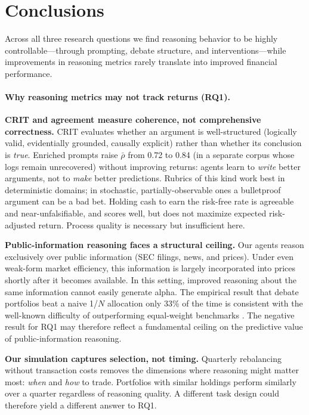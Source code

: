 \documentclass{article}
\begin{document}
\section{Conclusions}
\label{sec:conclusions}
\vspace{-0.3cm}

Across all three research questions we find reasoning behavior to be highly controllable---through prompting, debate structure, and interventions---while improvements in reasoning metrics rarely translate into improved financial performance. 

\vspace{-6pt}
\paragraph{Why reasoning metrics may not track returns (RQ1).}
\vspace{-4pt}


\textbf{CRIT and agreement measure coherence, not comprehensive correctness.}
CRIT evaluates whether an argument is well-structured (logically valid, evidentially grounded, causally explicit) rather than whether its conclusion is \emph{true}. Enriched prompts raise $\bar{\rho}$ from 0.72 to 0.84 (in a separate corpus whose logs remain unrecovered) without improving returns: agents learn to \emph{write} better arguments, not to \emph{make} better predictions. Rubrics of this kind work best in deterministic domains; in stochastic, partially-observable ones a bulletproof argument can be a bad bet. Holding cash to earn the risk-free rate is agreeable and near-unfalsifiable, and scores well, but does not maximize expected risk-adjusted return. Process quality is necessary but insufficient here.

\textbf{Public-information reasoning faces a structural ceiling.}
Our agents reason exclusively over public information (SEC filings, news, and prices). Under even weak-form market efficiency, this information is largely incorporated into prices shortly after it becomes available. In this setting, improved reasoning about the same information cannot easily generate alpha. The empirical result that debate portfolios beat a naive 1/$N$ allocation only 33\% of the time is consistent with the well-known difficulty of outperforming equal-weight benchmarks \citep{demiguel2009optimal}. The negative result for RQ1 may therefore reflect a fundamental ceiling on the predictive value of public-information reasoning.

\textbf{Our simulation captures selection, not timing.}
Quarterly rebalancing without transaction costs removes the dimensions where reasoning might matter most: \emph{when} and \emph{how} to trade. Portfolios with similar holdings perform similarly over a quarter regardless of reasoning quality. A different task design could therefore yield a different answer to RQ1.
\vspace{-6pt}
\end{document}
